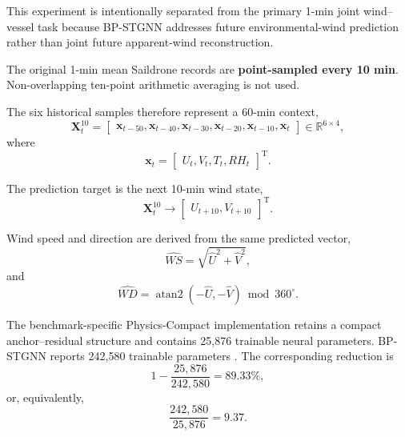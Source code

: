 This experiment is intentionally separated from the primary 1-min joint wind--vessel task because BP-STGNN addresses future environmental-wind prediction rather than joint future apparent-wind reconstruction.

The original 1-min mean Saildrone records are \textbf{point-sampled every 10 min}. Non-overlapping ten-point arithmetic averaging is not used.

The six historical samples therefore represent a 60-min context,
\begin{equation}
\mathbf X_t^{10}
=
\begin{bmatrix}
\mathbf x_{t-50},
\mathbf x_{t-40},
\mathbf x_{t-30},
\mathbf x_{t-20},
\mathbf x_{t-10},
\mathbf x_t
\end{bmatrix}
\in
\mathbb R^{6\times4},
\label{eq:bp_input}
\end{equation}
where
\begin{equation}
\mathbf x_t
=
\begin{bmatrix}
U_t,
V_t,
T_t,
RH_t
\end{bmatrix}^{\mathrm T}.
\end{equation}

The prediction target is the next 10-min wind state,
\begin{equation}
\boxed{
\mathbf X_t^{10}
\longrightarrow
\begin{bmatrix}
U_{t+10},
V_{t+10}
\end{bmatrix}^{\mathrm T}
}.
\label{eq:bp_target}
\end{equation}

Wind speed and direction are derived from the same predicted vector,
\begin{equation}
\widehat{WS}
=
\sqrt{
\hat U^2
+
\hat V^2
},
\label{eq:bp_ws}
\end{equation}
and
\begin{equation}
\widehat{WD}
=
\operatorname{atan2}
\left(
-\hat U,
-\hat V
\right)
\bmod 360^\circ.
\label{eq:bp_wd}
\end{equation}

The benchmark-specific Physics-Compact implementation retains a compact anchor--residual structure and contains 25,876 trainable neural parameters. BP-STGNN reports 242,580 trainable parameters \cite{Nie2026}. The corresponding reduction is
\begin{equation}
1
-
\frac{
25{,}876
}{
242{,}580
}
=
\boxed{
89.33\%
},
\label{eq:bp_param_reduction}
\end{equation}
or, equivalently,
\begin{equation}
\frac{
242{,}580
}{
25{,}876
}
=
\boxed{
9.37
}.
\label{eq:bp_param_ratio}
\end{equation}

